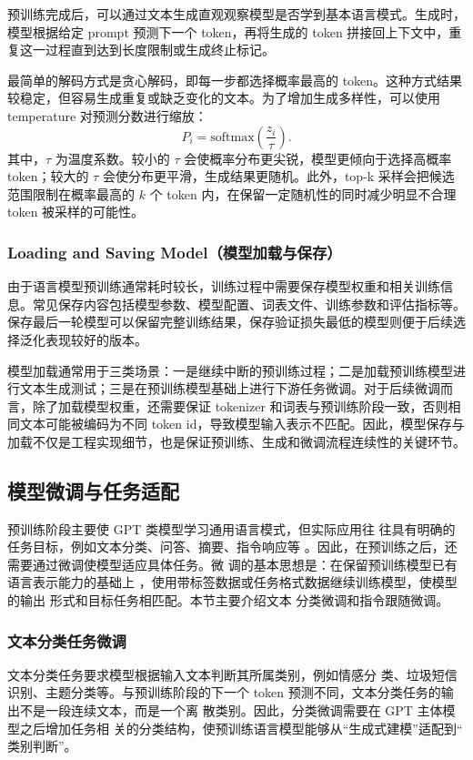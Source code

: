 \documentclass[UTF8,a4paper,zihao=-4,fontset=none]{ctexart}
\numberwithin{equation}{section}
\begin{document}
预训练完成后，可以通过文本生成直观观察模型是否学到基本语言模式。生成时，模型根据给定 prompt 预测下一个 token，再将生成的 token 拼接回上下文中，重复这一过程直到达到长度限制或生成终止标记。

最简单的解码方式是贪心解码，即每一步都选择概率最高的 token。这种方式结果较稳定，但容易生成重复或缺乏变化的文本。为了增加生成多样性，可以使用 temperature 对预测分数进行缩放：
\[
P_i=\mathrm{softmax}\left(\frac{z_i}{\tau}\right).
\]
其中，$\tau$ 为温度系数。较小的 $\tau$ 会使概率分布更尖锐，模型更倾向于选择高概率 token；较大的 $\tau$ 会使分布更平滑，生成结果更随机。此外，top-k 采样会把候选范围限制在概率最高的 $k$ 个 token 内，在保留一定随机性的同时减少明显不合理 token 被采样的可能性。

\subsubsection{Loading and Saving Model（模型加载与保存）}

由于语言模型预训练通常耗时较长，训练过程中需要保存模型权重和相关训练信息。常见保存内容包括模型参数、模型配置、词表文件、训练参数和评估指标等。保存最后一轮模型可以保留完整训练结果，保存验证损失最低的模型则便于后续选择泛化表现较好的版本。

模型加载通常用于三类场景：一是继续中断的预训练过程；二是加载预训练模型进行文本生成测试；三是在预训练模型基础上进行下游任务微调。对于后续微调而言，除了加载模型权重，还需要保证 tokenizer 和词表与预训练阶段一致，否则相同文本可能被编码为不同 token id，导致模型输入表示不匹配。因此，模型保存与加载不仅是工程实现细节，也是保证预训练、生成和微调流程连续性的关键环节。

\subsection{模型微调与任务适配}

预训练阶段主要使 GPT 类模型学习通用语言模式，但实际应用往
往具有明确的任务目标，例如文本分类、问答、摘要、指令响应等
。因此，在预训练之后，还需要通过微调使模型适应具体任务。微
调的基本思想是：在保留预训练模型已有语言表示能力的基础上
，使用带标签数据或任务格式数据继续训练模型，使模型的输出
形式和目标任务相匹配。本节主要介绍文本
分类微调和指令跟随微调。

\subsubsection{文本分类任务微调}

文本分类任务要求模型根据输入文本判断其所属类别，例如情感分
类、垃圾短信识别、主题分类等。与预训练阶段的下一个 token
预测不同，文本分类任务的输出不是一段连续文本，而是一个离
散类别。因此，分类微调需要在 GPT 主体模型之后增加任务相
关的分类结构，使预训练语言模型能够从“生成式建模”适配到“
类别判断”。
\end{document}
